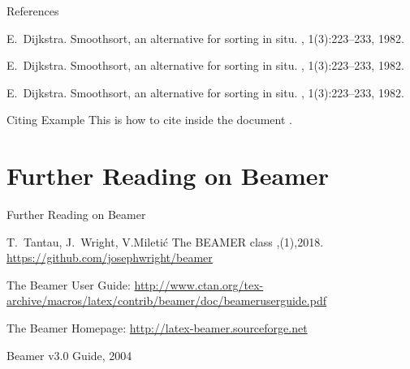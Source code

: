 \documentclass[10pt,xcolor=x11names]{beamer}
\begin{document}
\begin{frame}{References}
\begin{thebibliography}{12}
	
	\beamertemplatearticlebibitems
    E.~Dijkstra.
    \newblock Smoothsort, an alternative for sorting in situ.
    , 1(3):223--233, 1982.
	
	\beamertemplatebookbibitems
	E.~Dijkstra.
	\newblock Smoothsort, an alternative for sorting in situ.
	, 1(3):223--233, 1982.
	
	\beamertemplatetextbibitems
	E.~Dijkstra.
	\newblock Smoothsort, an alternative for sorting in situ.
	, 1(3):223--233, 1982.
\end{thebibliography} \vspace{10pt}

\begin{block}{Citing Example}
This is how to cite inside the document \cite{Dijkstra1982}.
\end{block}

\end{frame}

\section{Further Reading on Beamer}

\begin{frame}{Further Reading on Beamer}

\begin{thebibliography}{12}	
        T.~Tantau, J.~Wright, V.Miletić
        \newblock The BEAMER class
        ,(1),2018.
        \url{https://github.com/josephwright/beamer}
        
        \bibitem
        \newblook The Beamer User Guide: \alert{\url{http://www.ctan.org/tex-archive/macros/latex/contrib/beamer/doc/beameruserguide.pdf}}
        
  
        \bibitem 
        \newblook The Beamer Homepage: \alert{\url{http://latex-beamer.sourceforge.net}}
        
        \bibitem
        \newblook Beamer v3.0 Guide, 2004
\end{thebibliography}

\end{frame}
\end{document}
